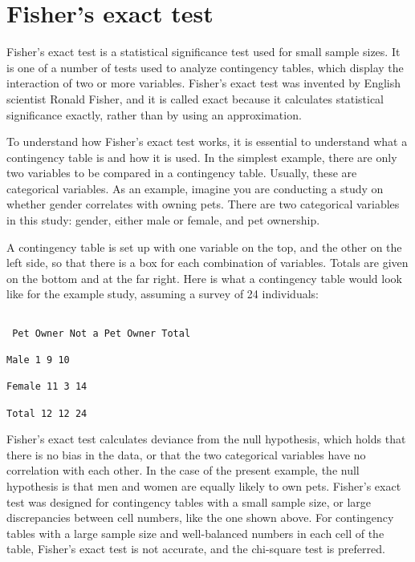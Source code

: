  





\section{Fisher's exact test}

 

Fisher's exact test is a statistical significance test used for small sample sizes. It is one of a number of tests used to analyze contingency tables, which display the interaction of two or more variables. Fisher's exact test was invented by English scientist Ronald Fisher, and it is called exact because it calculates statistical significance exactly, rather than by using an approximation.

 

To understand how Fisher's exact test works, it is essential to understand what a contingency table is and how it is used. In the simplest example, there are only two variables to be compared in a contingency table. Usually, these are categorical variables. As an example, imagine you are conducting a study on whether gender correlates with owning pets. There are two categorical variables in this study: gender, either male or female, and pet ownership.

 

A contingency table is set up with one variable on the top, and the other on the left side, so that there is a box for each combination of variables. Totals are given on the bottom and at the far right. Here is what a contingency table would look like for the example study, assuming a survey of 24 individuals:

\begin{verbatim}

 Pet Owner Not a Pet Owner Total

Male 1 9 10

Female 11 3 14

Total 12 12 24

\end{verbatim}

Fisher's exact test calculates deviance from the null hypothesis, which holds that there is no bias in the data, or that the two categorical variables have no correlation with each other. In the case of the present example, the null hypothesis is that men and women are equally likely to own pets. Fisher's exact test was designed for contingency tables with a small sample size, or large discrepancies between cell numbers, like the one shown above. For contingency tables with a large sample size and well-balanced numbers in each cell of the table, Fisher's exact test is not accurate, and the chi-square test is preferred.

